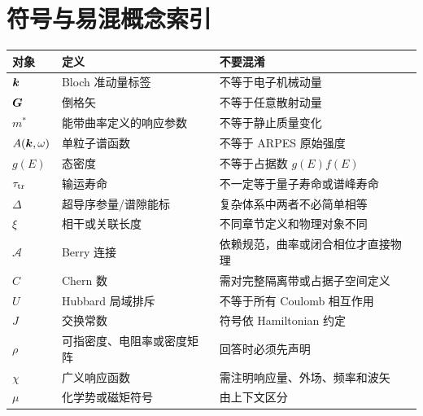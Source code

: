 \chapter{符号与易混概念索引}
\begin{longtable}{p{}p{}p{}}
\toprule
对象&定义&不要混淆\\\midrule
$\bm{k}$&Bloch 准动量标签&不等于电子机械动量\\
$\bm{G}$&倒格矢&不等于任意散射动量\\
$m^*$&能带曲率定义的响应参数&不等于静止质量变化\\
$A(\bm{k},\omega)$&单粒子谱函数&不等于 ARPES 原始强度\\
$g(E)$&态密度&不等于占据数 $g(E)f(E)$\\
$\tau_{\rm tr}$&输运寿命&不一定等于量子寿命或谱峰寿命\\
$\Delta$&超导序参量/谱隙能标&复杂体系中两者不必简单相等\\
$\xi$&相干或关联长度&不同章节定义和物理对象不同\\
$\mathcal A$&Berry 连接&依赖规范，曲率或闭合相位才直接物理\\
$C$&Chern 数&需对完整隔离带或占据子空间定义\\
$U$&Hubbard 局域排斥&不等于所有 Coulomb 相互作用\\
$J$&交换常数&符号依 Hamiltonian 约定\\
$\rho$&可指密度、电阻率或密度矩阵&回答时必须先声明\\
$\chi$&广义响应函数&需注明响应量、外场、频率和波矢\\
$\mu$&化学势或磁矩符号&由上下文区分\\\bottomrule
\end{longtable}

